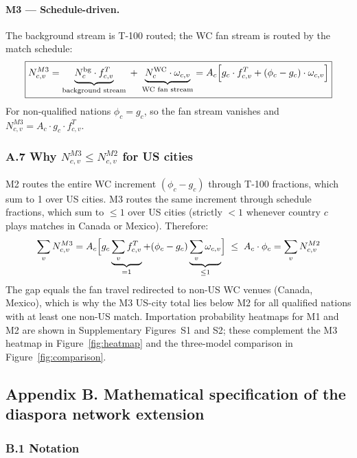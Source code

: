 \documentclass[12pt, a4paper]{article}
\begin{document}
\paragraph{M3 --- Schedule-driven.}
The background stream is T-100 routed; the WC fan stream is
routed by the match schedule:
\[
  \boxed{N_{c,v}^{M3}
    = \underbrace{N_c^{\text{bg}} \cdot f_{c,v}^{T}}_{\text{background stream}}
      \;+\;
      \underbrace{N_c^{\text{WC}} \cdot \omega_{c,v}}_{\text{WC fan stream}}
    = A_c \Bigl[
        g_c \cdot f_{c,v}^{T}
        + (\phi_c - g_c) \cdot \omega_{c,v}
      \Bigr]}
\]
For non-qualified nations $\phi_c = g_c$, so the fan stream
vanishes and $N_{c,v}^{M3} = A_c \cdot g_c \cdot f_{c,v}^{T}$.

\subsubsection*{A.7 Why $N_{c,v}^{M3} \leq N_{c,v}^{M2}$ for
US cities}

M2 routes the entire WC increment $(\phi_c - g_c)$ through T-100
fractions, which sum to 1 over US cities. M3 routes the same
increment through schedule fractions, which sum to $\leq 1$ over
US cities (strictly $<1$ whenever country $c$ plays matches in
Canada or Mexico). Therefore:
\[
  \sum_{v} N_{c,v}^{M3}
    = A_c \Bigl[
        g_c \underbrace{\sum_v f_{c,v}^T}_{=1}
        + (\phi_c - g_c)
          \underbrace{\sum_v \omega_{c,v}}_{\leq 1}
      \Bigr]
  \;\leq\;
  A_c \cdot \phi_c
    = \sum_v N_{c,v}^{M2}
\]
The gap equals the fan travel redirected to non-US WC venues
(Canada, Mexico), which is why the M3 US-city total lies below
M2 for all qualified nations with at least one non-US match.
Importation probability heatmaps for M1 and M2 are shown in
Supplementary Figures~S1 and S2; these complement the M3 heatmap
in Figure~\ref{fig:heatmap} and the three-model comparison in
Figure~\ref{fig:comparison}.

\newpage

\subsection*{Appendix B. Mathematical specification of the diaspora
network extension}

\subsubsection*{B.1 Notation}
\end{document}

